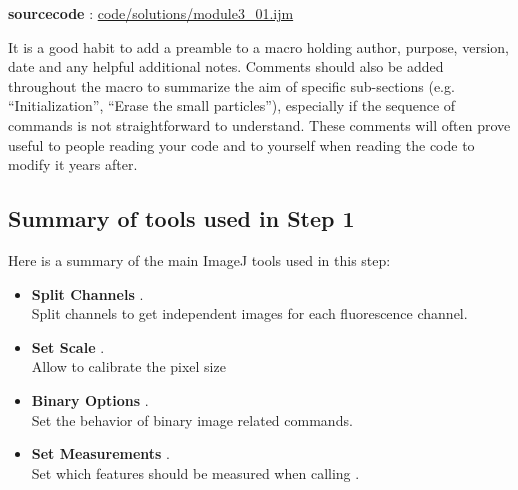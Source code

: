 \textbf{sourcecode} : \href{https://github.com/miura/mod3conversionTest2/blob/struct_authorea/module3_01.ijm}{code/solutions/module3\_01.ijm}

It is a good habit to add a preamble to a macro holding author, purpose, version, date and any helpful additional notes. Comments should also be added throughout the macro to summarize the aim of specific sub-sections (e.g. ``Initialization'', ``Erase the small particles''), especially if the sequence of commands is not straightforward to understand. These comments will often prove useful to people reading your code and to yourself when reading the code to modify it years after.

\subsection{Summary of tools used in Step 1}

Here is a summary of the main ImageJ tools used in this step:

\begin{itemize}
\item \textbf{Split Channels} .\\
Split channels to get independent images for each fluorescence channel.

\item \textbf{Set Scale} .\\
Allow to calibrate the pixel size

\item \textbf{Binary Options} .\\ 
Set the behavior of binary image related commands.

\item \textbf{Set Measurements} .\\ 
Set which features should be measured when calling .

\end{itemize}

\newpage
